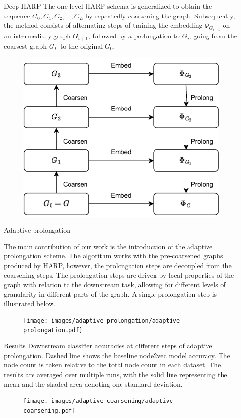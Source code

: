 \documentclass{beamer}
\newlength{\sepwidth}
\newlength{\colwidth}
\newcommand{\separatorcolumn}{\begin{column}{\sepwidth}\end{column}}
\begin{document}
\begin{frame}[t]
\begin{columns}[t]
	\separatorcolumn

	\begin{column}{\colwidth}
		\begin{block}{Deep HARP}
			The one-level HARP schema is generalized to obtain the sequence \( G_0, G_1, G_2, \dots, G_L \) by repeatedly coarsening the graph. Subsequently, the method consists of alternating steps of training the embedding \( \Phi_{G_{i + 1}} \) on an intermediary graph \( G_{i + 1} \), followed by a prolongation to \( G_{i} \), going from the coarsest graph \( G_L \) to the original \( G_0 \).
			\begin{figure}
				\includegraphics[width=0.45\linewidth]{images/deep-harp/deep-harp.pdf}
			\end{figure}
		\end{block}

		\begin{block}{Adaptive prolongation}

			The main contribution of our work is the introduction of the adaptive prolongation scheme. The algorithm works with the pre-coarsened graphs produced by HARP, however, the prolongation steps are decoupled from the coarsening steps. The prolongation steps are driven by local properties of the graph with relation to the downstream task, allowing for different levels of granularity in different parts of the graph. A single prolongation step is illustrated below.

			\begin{figure}
				\texttt{[image: images/adaptive-prolongation/adaptive-prolongation.pdf]}
			\end{figure}
		\end{block}

		\begin{block}{Results}
			Downstream classifier accuracies at different steps of adaptive prolongation. Dashed line shows the baseline node2vec model accuracy. The node count is taken relative to the total node count in each dataset. The results are averaged over multiple runs, with the solid line representing the mean and the shaded area denoting one standard deviation.
			\begin{figure}
				\texttt{[image: images/adaptive-coarsening/adaptive-coarsening.pdf]}
			\end{figure}
		\end{block}


\end{column}
\end{columns}
\end{frame}
\end{document}
